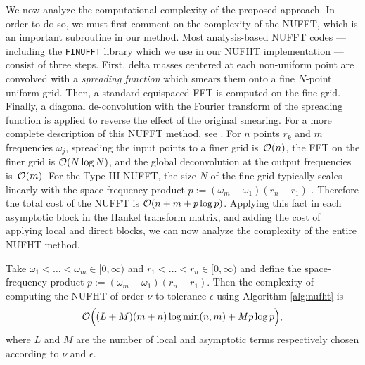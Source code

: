We now analyze the computational complexity of the proposed approach. In order
to do so, we must first comment on the complexity of the NUFFT, which is an
important subroutine in our method. Most analysis-based NUFFT codes ---
including the \texttt{FINUFFT} library \cite{barnett2019parallel} which we use
in our NUFHT implementation --- consist of three steps. First, delta masses
centered at each non-uniform point are convolved with a \textit{spreading
function} which smears them onto a fine $N$-point uniform grid. Then, a standard
equispaced FFT is computed on the fine grid. Finally, a diagonal de-convolution
with the Fourier transform of the spreading function is applied to reverse the
effect of the original smearing. For a more complete description of this NUFFT
method, see \cite{dutt1993fast,greengard2004accelerating,barnett2019parallel}.
For $n$ points $r_k$ and $m$ frequencies $\omega_j$, spreading the input points
to a finer grid is~$\mathcal{O}(n)$, the FFT on the finer grid is $\mathcal{O}(N\log N)$, and
the global deconvolution at the output frequencies is~$\mathcal{O}(m)$. For the Type-III
NUFFT, the size $N$ of the fine grid typically scales linearly with the
space-frequency product $p := (\omega_m - \omega_1)(r_n - r_1)$
\cite{barnett2019parallel, greengard2004accelerating}. Therefore the total cost
of the NUFFT is $\mathcal{O}(n + m + p\log p)$. Applying this fact in each asymptotic
block in the Hankel transform matrix, and adding the cost of applying local and
direct blocks, we can now analyze the complexity of the entire NUFHT method.

\begin{theorem} \label{thm:complexity} Take $\omega_1 < \dots < \omega_m \in
    [0,\infty)$ and $r_1 < \dots < r_n \in [0,\infty)$ and define the
    space-frequency product $p := (\omega_m - \omega_1)(r_n - r_1)$. Then the
    complexity of computing the NUFHT of order $\nu$ to tolerance $\epsilon$
    using Algorithm \ref{alg:nufht} is 
    $$\mathcal{O}\Big((L + M)(m + n) \log \min(n,m) + Mp\log p\Big),$$ where $L$ and $M$
    are the number of local and asymptotic terms respectively chosen according
    to $\nu$ and $\epsilon$.
\end{theorem}

